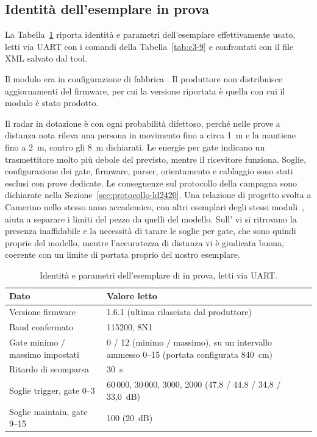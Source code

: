 \subsection{Identità dell'esemplare in prova}
\label{sec:c3-2-6}

La Tabella~\ref{tab:c3-11} riporta identità e parametri dell'esemplare effettivamente usato, letti via UART con i comandi della Tabella~\ref{tab:c3-9} e confrontati con il file XML salvato dal tool.

Il modulo era in configurazione di fabbrica \cite{hilinkProtoLD2420}. Il produttore non distribuisce aggiornamenti del firmware, per cui la versione riportata è quella con cui il modulo è stato prodotto.

Il radar in dotazione è con ogni probabilità difettoso, perché nelle prove a distanza nota rileva una persona in movimento fino a circa 1~m e la mantiene fino a 2~m, contro gli 8~m dichiarati. Le energie per gate indicano un trasmettitore molto più debole del previsto, mentre il ricevitore funziona. Soglie, configurazione dei gate, firmware, parser, orientamento e cablaggio sono stati esclusi con prove dedicate. Le conseguenze sul protocollo della campagna sono dichiarate nella Sezione~\ref{sec:protocollo-ld2420}. Una relazione di progetto svolta a Camerino nello stesso anno accademico, con altri esemplari degli stessi moduli~\cite{dellaquila2026}, aiuta a separare i limiti del pezzo da quelli del modello. Sull'\ldc{} vi si ritrovano la presenza inaffidabile e la necessità di tarare le soglie per gate, che sono quindi proprie del modello, mentre l'accuratezza di distanza vi è giudicata buona, coerente con un limite di portata proprio del nostro esemplare.

\begin{table}[!htb]
\centering
\caption{Identità e parametri dell'esemplare di \ldc{} in prova, letti via UART.}
\label{tab:c3-11}
\small
\begin{tabularx}{\linewidth}{@{}lX@{}}
\toprule
\textbf{Dato} & \textbf{Valore letto} \\
\midrule
Versione firmware & 1.6.1 (ultima rilasciata dal produttore) \\
Baud confermato & 115200, 8N1 \\
Gate minimo / massimo impostati & 0 / 12 (minimo / massimo), su un intervallo ammesso 0–15 (portata configurata 840~cm) \\
Ritardo di scomparsa & 30~s \\
Soglie trigger, gate 0–3 & 60\,000, 30\,000, 3000, 2000 (47,8 / 44,8 / 34,8 / 33,0~dB) \\
Soglie maintain, gate 9–15 & 100 (20~dB) \\
\bottomrule
\end{tabularx}
\end{table}

